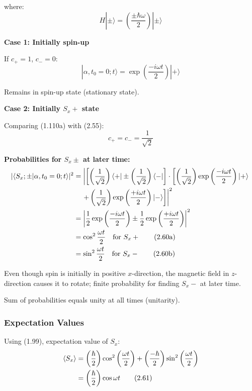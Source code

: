 \documentclass[11pt,a4paper]{article}
\begin{document}
where:
\begin{equation}
H|\pm\rangle = \left(\frac{\pm\hbar\omega}{2}\right)|\pm\rangle
\tag{2.57}
\end{equation}

\textbf{Case 1: Initially spin-up}

If $c_+ = 1$, $c_- = 0$:
\begin{equation}
|\alpha, t_0 = 0; t\rangle = \exp\left(\frac{-i\omega t}{2}\right)|+\rangle
\tag{2.58}
\end{equation}

Remains in spin-up state (stationary state).

\textbf{Case 2: Initially $S_x+$ state}

Comparing (1.110a) with (2.55):
\begin{equation}
c_+ = c_- = \frac{1}{\sqrt{2}}
\tag{2.59}
\end{equation}

\textbf{Probabilities for $S_x\pm$ at later time:}
\begin{align}
|\langle S_x; \pm|\alpha, t_0 = 0; t\rangle|^2 &= \left|\left[\left(\frac{1}{\sqrt{2}}\right)\langle+| \pm \left(\frac{1}{\sqrt{2}}\right)\langle-|\right] \cdot \left[\left(\frac{1}{\sqrt{2}}\right)\exp\left(\frac{-i\omega t}{2}\right)|+\rangle\right.\right. \notag \\
&\quad\left.\left. + \left(\frac{1}{\sqrt{2}}\right)\exp\left(\frac{+i\omega t}{2}\right)|-\rangle\right]\right|^2 \notag \\
&= \left|\frac{1}{2}\exp\left(\frac{-i\omega t}{2}\right) \pm \frac{1}{2}\exp\left(\frac{+i\omega t}{2}\right)\right|^2 \notag \\
&= \cos^2\frac{\omega t}{2} \quad \text{for } S_x+ \tag{2.60a} \\
&= \sin^2\frac{\omega t}{2} \quad \text{for } S_x- \tag{2.60b}
\end{align}

Even though spin is initially in positive $x$-direction, the magnetic field in $z$-direction causes it to rotate; finite probability for finding $S_x-$ at later time.

Sum of probabilities equals unity at all times (unitarity).

\subsubsection{Expectation Values}

Using (1.99), expectation value of $S_x$:
\begin{align}
\langle S_x \rangle &= \left(\frac{\hbar}{2}\right)\cos^2\left(\frac{\omega t}{2}\right) + \left(\frac{-\hbar}{2}\right)\sin^2\left(\frac{\omega t}{2}\right) \notag \\
&= \left(\frac{\hbar}{2}\right)\cos\omega t
\tag{2.61}
\end{align}
\end{document}
